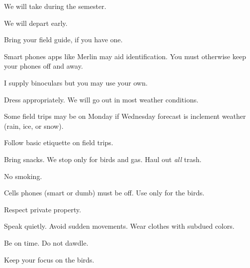 \documentclass[t]{beamer}
\begin{document}
\begin{frame}[t,plain]{We will take  during the semester.}

	\vspace{-0.5\baselineskip}
	
	\hangpara {}
	
	\hangpara We will depart early. 
	
	\hangpara Bring your field guide, if you have one.

	\hangpara Smart phones apps like Merlin may aid identification. You must otherwise keep your phones off and away.

	\hangpara I supply binoculars but you may use your own. 

	\hangpara Dress appropriately. We will go out in most weather conditions.
		
	\hangpara Some field trips may be on Monday if Wednesday forecast is inclement weather (rain, ice, or snow).
	
\end{frame}

\begin{frame}[t,plain]{Follow basic etiquette on field trips.}

	\vspace{-0.5\baselineskip}
	
	\hangpara Bring snacks. We stop only for birds and gas. Haul out \textit{all} trash.
	
	\hangpara No smoking.
	
	\hangpara Cells phones (smart or dumb) must be off. Use only for the birds.

	\hangpara Respect private property.
	
	\hangpara Speak quietly. Avoid sudden movements. Wear clothes with subdued colors.
	
	\hangpara Be on time. Do not dawdle.
	
	\hangpara Keep your focus on the birds.
	
\end{frame}
\end{document}
